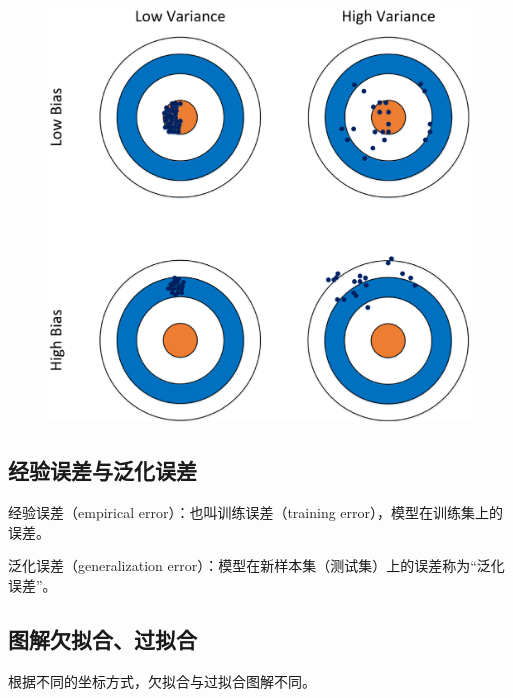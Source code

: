 \begin{itemize}
\begin{itemize}
 \begin{figure}[h]
   \centering
   \includegraphics[width=.9\textwidth]{imgs/2.16.20.1.eps}
   \label{fig:2.16.20.1}
 \end{figure}
		\end{itemize}
\end{itemize}

\subsection{经验误差与泛化误差}

经验误差（empirical error）：也叫训练误差（training error），模型在训练集上的误差。 

泛化误差（generalization error）：模型在新样本集（测试集）上的误差称为“泛化误差”。

\subsection{图解欠拟合、过拟合}

根据不同的坐标方式，欠拟合与过拟合图解不同。

